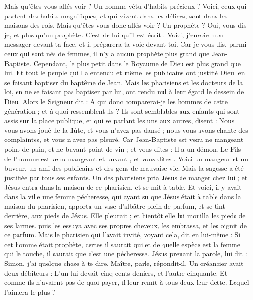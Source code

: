 \begin{multicols}{2}
Mais qu'êtes-vous allés voir ? Un homme vêtu d'habits précieux ? Voici, ceux qui portent des habits magnifiques, et qui vivent dans les délices, sont dans les maisons des rois.
Mais qu'êtes-vous donc allés voir ? Un prophète ? Oui, vous dis-je, et plus qu'un prophète.
C'est de lui qu'il est écrit : Voici, j'envoie mon messager devant ta face, et il préparera ta voie devant toi.
Car je vous dis, parmi ceux qui sont nés de femmes, il n'y a aucun prophète plus grand que Jean-Baptiste. Cependant, le plus petit dans le Royaume de Dieu est plus grand que lui.
Et tout le peuple qui l'a entendu et même les publicains ont justifié Dieu, en se faisant baptiser du baptême de Jean.
Mais les pharisiens et les docteurs de la loi, en ne se faisant pas baptiser par lui, ont rendu nul à leur égard le dessein de Dieu.
Alors le Seigneur dit : A qui donc comparerai-je les hommes de cette génération ; et à quoi ressemblent-ils ?
Ils sont semblables aux enfants qui sont assis sur la place publique, et qui se parlant les uns aux autres, disent : Nous vous avons joué de la flûte, et vous n'avez pas dansé ; nous vous avons chanté des complaintes, et vous n'avez pas pleuré.
Car Jean-Baptiste est venu ne mangeant point de pain, et ne buvant point de vin ; et vous dites : Il a un démon.
Le Fils de l'homme est venu mangeant et buvant ; et vous dites : Voici un mangeur et un buveur, un ami des publicains et des gens de mauvaise vie.
Mais la sagesse a été justifiée par tous ses enfants.
Un des pharisiens pria Jésus de manger chez lui ; et Jésus entra dans la maison de ce pharisien, et se mit à table.
Et voici, il y avait dans la ville une femme pécheresse, qui ayant su que Jésus était à table dans la maison du pharisien, apporta un vase d'albâtre plein de parfum,
et se tint derrière, aux pieds de Jésus. Elle pleurait ; et bientôt elle lui mouilla les pieds de ses larmes, puis les essuya avec ses propres cheveux, les embrassa, et les oignit de ce parfum.
Mais le pharisien qui l'avait invité, voyant cela, dit en lui-même : Si cet homme était prophète, certes il saurait qui et de quelle espèce est la femme qui le touche, il saurait que c'est une pécheresse.
Jésus prenant la parole, lui dit : Simon, j'ai quelque chose à te dire. Maître, parle, répondit-il.
Un créancier avait deux débiteurs : L'un lui devait cinq cents deniers, et l'autre cinquante.
Et comme ils n'avaient pas de quoi payer, il leur remit à tous deux leur dette. Lequel l'aimera le plus ?

\end{multicols}
